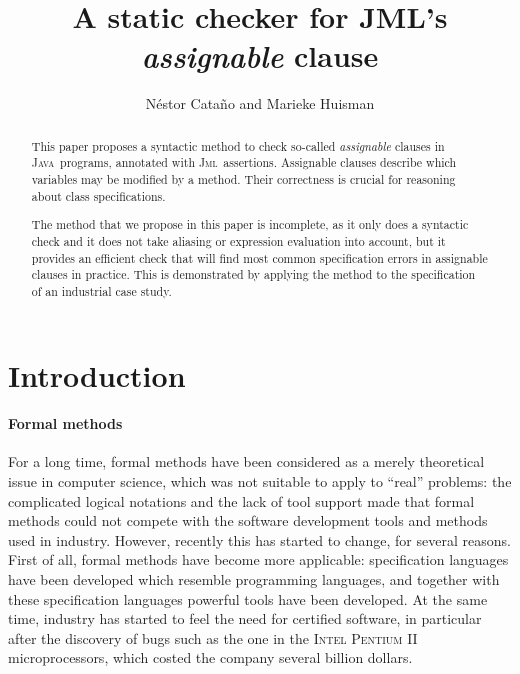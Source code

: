 \documentclass[a4paper]{llncs}
\title{A static checker for JML's \emph{assignable} clause}
\author{
  N\'estor Cata\~no and Marieke Huisman  \\
  \institute{
       \inria\ Sophia-Antipolis, France \\
  } 
  \email{\{Nestor.Catano, Marieke.Huisman\}@sophia.inria.fr}
}
\newcommand{\jml}{\textsc{Jml}}
\newcommand{\java}{\textsc{Java}}
\newcommand{\gplus}{\textsc{GemPlus}}
\begin{document}
\fussy
\maketitle
\pagestyle{plain}

\begin{abstract}
This paper proposes a syntactic method to check so-called
\emph{assignable} clauses in \java\ programs, annotated with \jml\
assertions. Assignable clauses describe which variables may be
modified by a method. Their correctness is crucial for reasoning about 
class specifications. 

The method that we propose in this paper is incomplete, as it only
does a syntactic check and it does not take aliasing or expression evaluation
into account, but it provides an efficient check that will find most
common specification errors in assignable clauses in practice. This is 
demonstrated by applying the method to the specification of an
industrial case study.



\end{abstract}






\section{Introduction}
\label{sec-intro}

\paragraph{\bf Formal methods}
For a long time, formal methods have been considered as a merely
theoretical issue in computer science, which was not suitable to apply
to ``real'' problems: the complicated logical notations and the lack
of tool support made that formal methods could not compete with the
software development tools and methods used in industry. However,
recently this has started to change, for several reasons. First of
all, formal methods have become more applicable: specification
languages have been developed which resemble programming languages,
and together with these specification languages powerful tools have
been developed. At the same time, industry has started to feel the
need for certified software, in particular after the discovery of bugs such as
the one in the \textsc{Intel} \textsc{Pentium II} microprocessors,
which costed the company several billion dollars.
\end{document}
